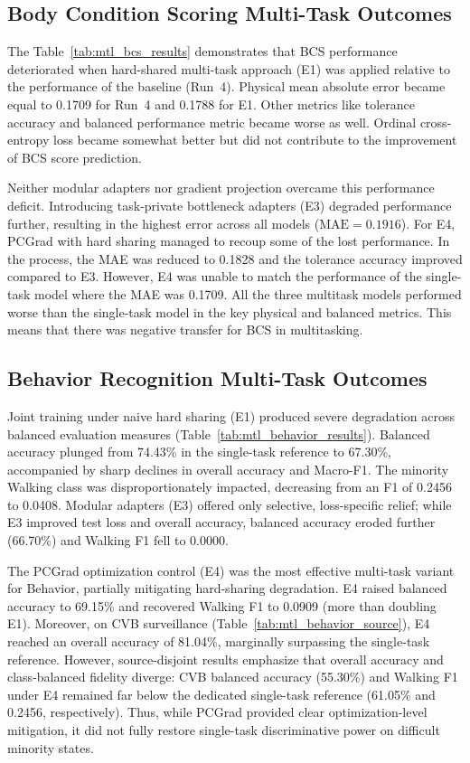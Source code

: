\subsection{Body Condition Scoring Multi-Task Outcomes}

The Table~\ref{tab:mtl_bcs_results} demonstrates that BCS performance deteriorated when hard-shared multi-task approach (E1) was applied relative to the performance of the baseline (Run~4). Physical mean absolute error became equal to 0.1709 for Run~4 and 0.1788 for E1. Other metrics like tolerance accuracy and balanced performance metric became worse as well. Ordinal cross-entropy loss became somewhat better but did not contribute to the improvement of BCS score prediction.



Neither modular adapters nor gradient projection overcame this performance deficit. Introducing task-private bottleneck adapters (E3) degraded performance further, resulting in the highest error across all models ($\mathrm{MAE} = 0.1916$). For E4, PCGrad with hard sharing managed to recoup some of the lost performance. In the process, the MAE was reduced to 0.1828 and the tolerance accuracy improved compared to E3. However, E4 was unable to match the performance of the single-task model where the MAE was 0.1709. All the three multitask models performed worse than the single-task model in the key physical and balanced metrics. This means that there was negative transfer for BCS in multitasking.

\subsection{Behavior Recognition Multi-Task Outcomes}

Joint training under naive hard sharing (E1) produced severe degradation across balanced evaluation measures (Table~\ref{tab:mtl_behavior_results}). Balanced accuracy plunged from 74.43\% in the single-task reference to 67.30\%, accompanied by sharp declines in overall accuracy and Macro-F1. The minority Walking class was disproportionately impacted, decreasing from an F1 of 0.2456 to 0.0408. Modular adapters (E3) offered only selective, loss-specific relief; while E3 improved test loss and overall accuracy, balanced accuracy eroded further (66.70\%) and Walking F1 fell to 0.0000.



The PCGrad optimization control (E4) was the most effective multi-task variant for Behavior, partially mitigating hard-sharing degradation. E4 raised balanced accuracy to 69.15\% and recovered Walking F1 to 0.0909 (more than doubling E1). Moreover, on CVB surveillance (Table~\ref{tab:mtl_behavior_source}), E4 reached an overall accuracy of 81.04\%, marginally surpassing the single-task reference. However, source-disjoint results emphasize that overall accuracy and class-balanced fidelity diverge: CVB balanced accuracy (55.30\%) and Walking F1 under E4 remained far below the dedicated single-task reference (61.05\% and 0.2456, respectively). Thus, while PCGrad provided clear optimization-level mitigation, it did not fully restore single-task discriminative power on difficult minority states.

